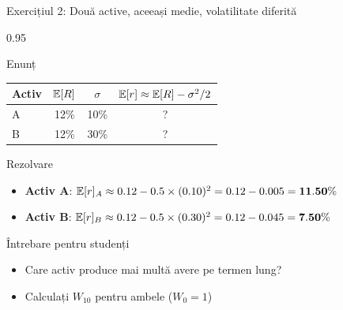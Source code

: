 \documentclass[9pt, aspectratio=169, t]{beamer}
\begin{document}
\begin{frame}[shrink=7]{Exercițiul 2: Două active, aceeași medie, volatilitate diferită}
    \begin{cminipage}{0.95\textwidth}
    \begin{block}{Enunț}
    \begin{center}
    {\small
    \renewcommand{\arraystretch}{1.3}
    \begin{tabular}{lccc}
    \toprule
    \textbf{Activ} & $\mathbb{E}[R]$ & $\sigma$ & $\mathbb{E}[r] \approx \mathbb{E}[R] - \sigma^2/2$ \\
    \midrule
    A & 12\% & 10\% & ? \\
    B & 12\% & 30\% & ? \\
    \bottomrule
    \end{tabular}
    }
    \end{center}
    \end{block}
    \vspace{0.2cm}
    \begin{exampleblock}{Rezolvare}
    \begin{itemize}\setlength{\itemsep}{0pt}
        \item \textbf{Activ A}: $\mathbb{E}[r]_A \approx 0.12 - 0.5 \times (0.10)^2 = 0.12 - 0.005 = \mathbf{11.50\%}$
        \item \textbf{Activ B}: $\mathbb{E}[r]_B \approx 0.12 - 0.5 \times (0.30)^2 = 0.12 - 0.045 = \mathbf{7.50\%}$
    \end{itemize}
    \end{exampleblock}
    \vspace{0.1cm}
    \begin{alertblock}{Întrebare pentru studenți}
    \begin{itemize}\setlength{\itemsep}{0pt}
        \item Care activ produce mai multă avere pe termen lung?
        \item Calculați $W_{10}$ pentru ambele ($W_0 = 1$)
    \end{itemize}
    \end{alertblock}
    \end{cminipage}
\end{frame}
\end{document}
